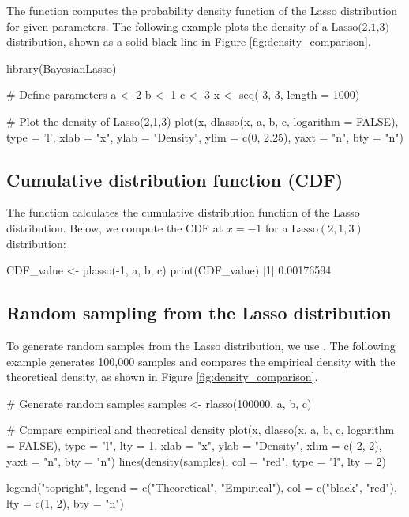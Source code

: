 The function  computes the probability density function of the Lasso distribution for given parameters. The following example plots the density of a $\text{Lasso(2,1,3)}$ distribution, shown as a solid black line in Figure \ref{fig:density_comparison}.

\begin{example}
library(BayesianLasso)

# Define parameters
a <- 2
b <- 1
c <- 3
x <- seq(-3, 3, length = 1000)

# Plot the density of Lasso(2,1,3)
plot(x, dlasso(x, a, b, c, logarithm = FALSE), type = 'l', 
     xlab = "x", ylab = "Density", 
     ylim = c(0, 2.25), yaxt = "n", bty = "n")
\end{example}



\subsection{Cumulative distribution function (CDF)}
The function  calculates the cumulative distribution function of the Lasso distribution. Below, we compute the CDF at $x = -1$ for a $\text{Lasso}(2,1,3)$ distribution:

\begin{example}
CDF_value <- plasso(-1, a, b, c)
print(CDF_value)
[1] 0.00176594
\end{example}

\subsection{Random sampling from the Lasso distribution}
To generate random samples from the Lasso distribution, we use . The following example generates 100,000 samples and compares the empirical density with the theoretical density, as shown in Figure \ref{fig:density_comparison}.

\begin{example}
# Generate random samples
samples <- rlasso(100000, a, b, c)

# Compare empirical and theoretical density
plot(x, dlasso(x, a, b, c, logarithm = FALSE), type = "l", lty = 1,
     xlab = "x", ylab = "Density",
     xlim = c(-2, 2), yaxt = "n", bty = "n")
lines(density(samples), col = "red", type = "l", lty = 2)

legend("topright", legend = c("Theoretical", "Empirical"), col = c("black", "red"),
       lty = c(1, 2), bty = "n")
\end{example}

